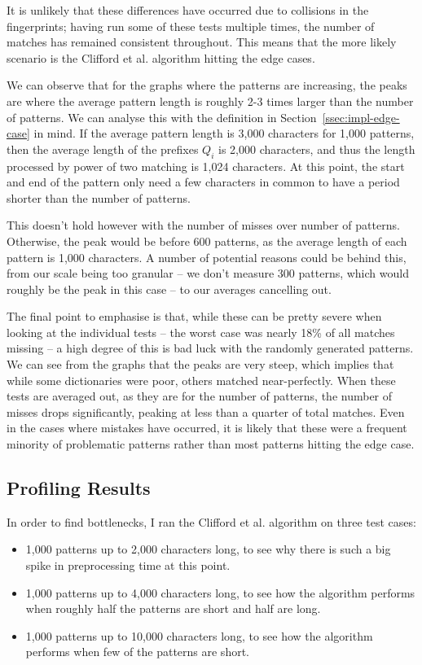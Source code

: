 \documentclass[ %
                    author={Dominic Joseph Moylett},
                    degree={MEng},
                     title={Dictionary Matching with Fingerprints},
                  subtitle={An Empirical Analysis},
                      type={research},
                      year={2015} ]{dissertation}
\begin{document}
It is unlikely that these differences have occurred due to collisions in the fingerprints; having run some of these tests multiple times, the number of matches has remained consistent throughout. This means that the more likely scenario is the Clifford et al. algorithm hitting the edge cases.

We can observe that for the graphs where the patterns are increasing, the peaks are where the average pattern length is roughly 2-3 times larger than the number of patterns. We can analyse this with the definition in Section~\ref{ssec:impl-edge-case} in mind. If the average pattern length is 3,000 characters for 1,000 patterns, then the average length of the prefixes $Q_i$ is 2,000 characters, and thus the length processed by power of two matching is 1,024 characters. At this point, the start and end of the pattern only need a few characters in common to have a period shorter than the number of patterns.

This doesn't hold however with the number of misses over number of patterns. Otherwise, the peak would be before 600 patterns, as the average length of each pattern is 1,000 characters. A number of potential reasons could be behind this, from our scale being too granular -- we don't measure 300 patterns, which would roughly be the peak in this case -- to our averages cancelling out.

The final point to emphasise is that, while these can be pretty severe when looking at the individual tests -- the worst case was nearly 18\% of all matches missing -- a high degree of this is bad luck with the randomly generated patterns. We can see from the graphs that the peaks are very steep, which implies that while some dictionaries were poor, others matched near-perfectly. When these tests are averaged out, as they are for the number of patterns, the number of misses drops significantly, peaking at less than a quarter of total matches. Even in the cases where mistakes have occurred, it is likely that these were a frequent minority of problematic patterns rather than most patterns hitting the edge case.

\subsection{Profiling Results}
\label{sec:profile-results}

In order to find bottlenecks, I ran the Clifford et al. algorithm on three test cases:

\begin{itemize}
  \item 1,000 patterns up to 2,000 characters long, to see why there is such a big spike in preprocessing time at this point.
  \item 1,000 patterns up to 4,000 characters long, to see how the algorithm performs when roughly half the patterns are short and half are long.
  \item 1,000 patterns up to 10,000 characters long, to see how the algorithm performs when few of the patterns are short.
\end{itemize}
\end{document}
